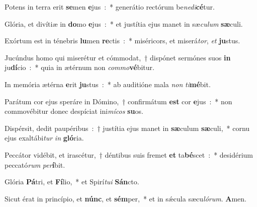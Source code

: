 ﻿\item Potens in terra erit \textbf{se}\-men \textbf{e}jus~:~* generátio rectórum be\emph{ne}\emph{di}\textbf{cé}tur.
\item Glória, et divítiæ in \textbf{do}\-mo \textbf{e}jus~:~* et justítia ejus manet in sæ\emph{cu}\-\emph{lum} \textbf{sæ}culi.
\item Exórtum est in ténebris \textbf{lu}\-men \textbf{re}\-ctis~:~* miséricors, et miserá\emph{tor}, \emph{et} \textbf{ju}stus.
\item Jucúndus homo qui miserétur et cómmodat,~† dispónet sermónes suos \textbf{in} ju\textbf{dí}\-cio~:~* quia in ætérnum non \emph{com}\emph{mo}\textbf{vé}bitur.
\item In memória ætérna \textbf{e}\-rit \textbf{ju}\-stus~:~* ab auditióne mala \emph{non} \emph{ti}\textbf{mé}bit.
\item Parátum cor ejus speráre in Dómino,~† confirmátum \textbf{est} cor \textbf{e}jus~:~* non commovébitur donec despíciat ini\emph{mí}\-\emph{cos} \textbf{su}os.
\item Dispérsit, dedit pau\-pé\-ri\-bus~:~† justítia ejus manet in \textbf{sæ}\-culum \textbf{sæ}\-culi,~* cornu ejus exaltábi\emph{tur} \emph{in} \textbf{gló}ria.
\item Peccátor vidébit, et irascétur,~† déntibus suis fremet \textbf{et} ta\textbf{bé}\-scet~:~* desidérium peccató\emph{rum} \emph{per}\textbf{í}bit.
\item Glória \textbf{Pá}\-tri, et \textbf{Fí}\-lio,~* et Spirí\emph{tu}\-\emph{i} \textbf{Sán}cto.
\item Sicut érat in princípio, et \textbf{núnc}, et \textbf{sém}\-per,~* et in sǽcula sæcu\emph{ló}\-\emph{rum}. \textbf{A}men.